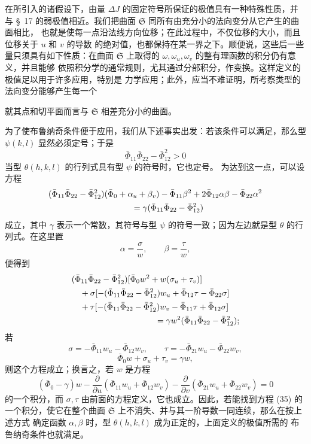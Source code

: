 \documentclass[11pt,a4paper,leqno]{article}
\begin{document}
在所引入的诸假设下，由量 $\Delta J$ 的固定符号所保证的极值具有一种特殊性质，并与
\S~17 的弱极值相近。我们把曲面 $\mathfrak{S}$ 同所有由充分小的法向变分从它产生的曲面相比，
也就是使每一点沿法线方向位移；在此过程中，不仅位移的大小，而且位移关于 $u$ 和 $v$ 的导数
的绝对值，也都保持在某一界之下。顺便说，这些后一些量只须具有如下性质：在曲面
$\mathfrak{S}$ 上取得的 $\omega,\omega_u,\omega_v$ 的整有理函数的积分仍有意义，并且能够
依照积分学的通常规则，尤其通过分部积分，作变换。这样定义的极值足以用于许多应用，特别是
力学应用；此外，应当不难证明，所考察类型的法向变分能够产生每一个

就其点和切平面而言与 $\mathfrak{S}$ 相差充分小的曲面。

为了使布鲁纳奇条件便于应用，我们从下述事实出发：若该条件可以满足，那么型
$\psi(k,l)$ 显然必须定号；于是
\[
\bar\Phi_{11}\bar\Phi_{22}-\bar\Phi_{12}^{2}>0
\]
当型 $\theta(h,k,l)$ 的行列式具有型 $\psi$ 的符号时，它也定号。
为达到这一点，可以设方程
\[
\begin{aligned}
&(\bar\Phi_{11}\bar\Phi_{22}-\bar\Phi_{12}^{2})
(\bar\Phi_0+\alpha_u+\beta_v)-\bar\Phi_{11}\beta^2
+2\bar\Phi_{12}\alpha\beta-\bar\Phi_{22}\alpha^2\\
&\hspace{35mm}=\gamma
(\bar\Phi_{11}\bar\Phi_{22}-\bar\Phi_{12}^{2})
\end{aligned}
\]
成立，其中 $\gamma$ 表示一个常数，其符号与型 $\psi$ 的符号一致；因为左边就是型
$\theta$ 的行列式。在这里置
\[
\alpha=\frac{\sigma}{w},\qquad \beta=\frac{\tau}{w},
\]
便得到
\[
\begin{aligned}
&(\bar\Phi_{11}\bar\Phi_{22}-\bar\Phi_{12}^{2})
[\bar\Phi_0w^2+w(\sigma_u+\tau_v)]\\
&\quad+\sigma[-(\bar\Phi_{11}\bar\Phi_{22}-\bar\Phi_{12}^{2})w_u
+\bar\Phi_{12}\tau-\bar\Phi_{22}\sigma]\\
&\quad+\tau[-(\bar\Phi_{11}\bar\Phi_{22}-\bar\Phi_{12}^{2})w_v
-\bar\Phi_{11}\tau+\bar\Phi_{12}\sigma]\\
&\hspace{35mm}=\gamma w^2
(\bar\Phi_{11}\bar\Phi_{22}-\bar\Phi_{12}^{2});
\end{aligned}
\]
若
\[
\sigma=-\bar\Phi_{11}w_u-\bar\Phi_{12}w_v,\qquad
\tau=-\bar\Phi_{21}w_u-\bar\Phi_{22}w_v,
\]
\[
\bar\Phi_0w+\sigma_u+\tau_v=\gamma w,
\]
则这个方程成立；换言之，若 $w$ 是方程
\begin{equation}\tag{35}
(\bar\Phi_0-\gamma)w
-\frac{\partial}{\partial u}(\bar\Phi_{11}w_u+\bar\Phi_{12}w_v)
-\frac{\partial}{\partial v}(\bar\Phi_{21}w_u+\bar\Phi_{22}w_v)=0
\end{equation}
的一个积分，而 $\sigma,\tau$ 由前面的方程定义，它也成立。因此，若能找到方程 (35)
的一个积分，使它在整个曲面 $\mathfrak{S}$ 上不消失、并与其一阶导数一同连续，那么在按上述方式
确定函数 $\alpha,\beta$ 时，型 $\theta(h,k,l)$ 成为正定的，上面定义的极值所需的
布鲁纳奇条件也就满足。
\end{document}
